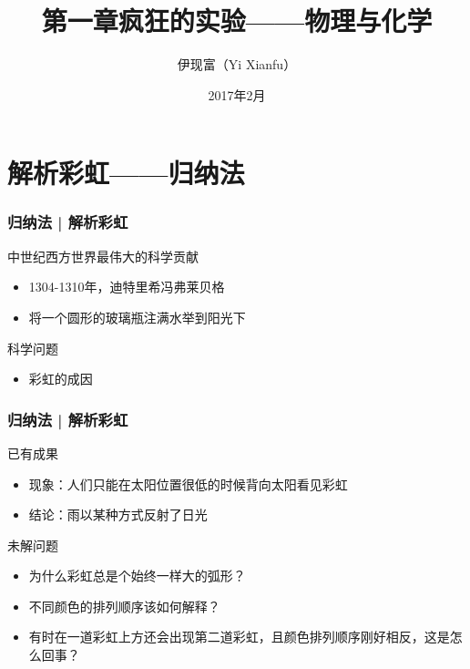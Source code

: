 



\title[物理与化学]{第一章\quad 疯狂的实验——物理与化学}
\author[Yixf]{伊现富（Yi Xianfu）}
\date{2017年2月}



\section{解析彩虹——归纳法}
\begin{frame}
  \frametitle{归纳法 | 解析彩虹}
  \begin{block}{中世纪西方世界最伟大的科学贡献}
    \begin{itemize}
      \item 1304-1310年，迪特里希\textbullet 冯\textbullet 弗莱贝格
      \item 将一个圆形的玻璃瓶注满水举到阳光下
    \end{itemize}
  \end{block}
  \pause
  \begin{block}{科学问题}
    \begin{itemize}
      \item 彩虹的成因
    \end{itemize}
    \vspace{-1.5em}
    \begin{figure}
      \centering
    \end{figure}
  \end{block}
\end{frame}

\begin{frame}
  \frametitle{归纳法 | 解析彩虹}
  \begin{block}{已有成果}
    \begin{itemize}
      \item 现象：人们只能在太阳位置很低的时候背向太阳看见彩虹
      \item 结论：雨以某种方式反射了日光
    \end{itemize}
  \end{block}
  \pause
  \begin{block}{未解问题}
    \begin{itemize}
      \item 为什么彩虹总是个始终一样大的弧形？
      \item 不同颜色的排列顺序该如何解释？
      \item 有时在一道彩虹上方还会出现第二道彩虹，且颜色排列顺序刚好相反，这是怎么回事？
    \end{itemize}
  \end{block}
\end{frame}

